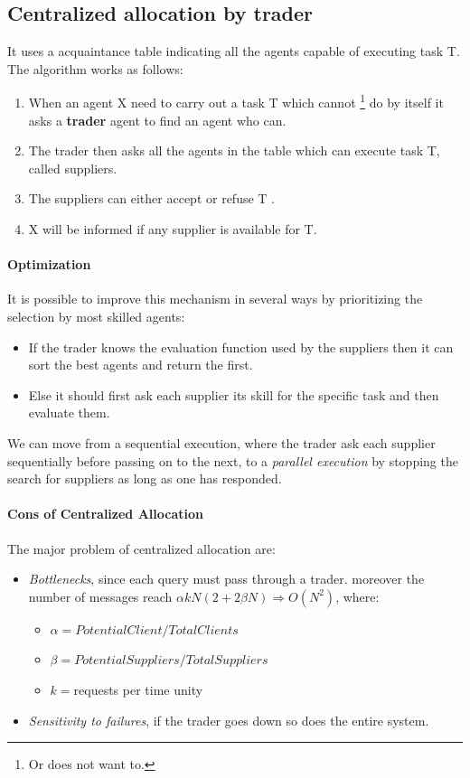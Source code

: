 \documentclass[10pt,a4paper]{article}
\begin{document}
\subsection{Centralized allocation by trader}
It uses a acquaintance table indicating all the agents capable of executing task T. The algorithm works as follows: 
\begin{enumerate}
\item When an agent X need to carry out a task T which cannot \footnote{Or does not want to.} do by itself it asks a \textbf{trader} agent to find an agent who can.
\item The trader then asks all the agents in the table which can execute task T, called suppliers.
\item The suppliers can either accept or refuse T .
\item X will be informed if any supplier is available for T.
\end{enumerate}

\paragraph{Optimization}
It is possible to improve this mechanism in several ways by prioritizing the selection by most skilled agents:
\begin{itemize}
\item If the trader knows the evaluation function used by the suppliers then it can sort the best agents and return the first.
\item Else it should first ask each supplier its skill for the specific task and then evaluate them.
\end{itemize}

We can move from a sequential execution, where the trader ask each supplier sequentially before passing on to the next, to a \textit{parallel execution} by stopping the search for suppliers as long as one has responded.


\paragraph{Cons of Centralized Allocation}
The major problem of centralized allocation are:
\begin{itemize}
\item \textit{Bottlenecks}, since each query must pass through a trader. moreover the number of messages reach $\alpha kN(2+2\beta N)\Rightarrow O(N^2)$, where:

	\begin{itemize}
	\item $\alpha=PotentialClient/TotalClients$
	\item $\beta=PotentialSuppliers/TotalSuppliers$
	\item $k=$requests per time unity
	\end{itemize}

\item \textit{Sensitivity to failures}, if the trader goes down so does the entire system.
\end{itemize}
\end{document}
